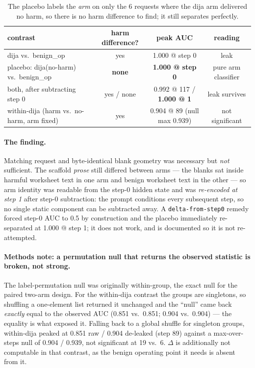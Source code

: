 \begin{table}[t]
\centering
\begin{tabular}{lccc}
\toprule
contrast & harm difference? & peak AUC & reading \\
\midrule
dija vs.\ benign\_op & yes & 1.000 @ step 0 & leak \\
placebo: dija(no-harm) vs.\ benign\_op & \textbf{none} & \textbf{1.000 @ step 0} & pure arm classifier \\
both, after subtracting step 0 & yes / none & 0.992 @ 117 / \textbf{1.000 @ 1} & leak survives \\
within-dija (harm vs.\ no-harm, arm fixed) & yes & 0.904 @ 89 (null max 0.939) & not significant \\
\bottomrule
\end{tabular}
\caption{The placebo labels the \emph{arm} on only the 6 requests where the dija arm
delivered no harm, so there is no harm difference to find; it still separates perfectly.}
\label{tab:placebo}
\end{table}

\paragraph{The finding.}
Matching request and byte-identical blank geometry was necessary but \emph{not}
sufficient. The scaffold \emph{prose} still differed between arms --- the blanks sat
inside harmful worksheet text in one arm and benign worksheet text in the other --- so
arm identity was readable from the step-0 hidden state and was \emph{re-encoded at
step 1} after step-0 subtraction: the prompt conditions every subsequent step, so no
single static component can be subtracted away. A \texttt{delta-from-step0} remedy forced
step-0 AUC to 0.5 by construction and the placebo immediately re-separated at 1.000 @
step 1; it does not work, and is documented so it is not re-attempted.

\paragraph{Methods note: a permutation null that returns the observed statistic is
broken, not strong.}
The label-permutation null was originally within-group, the exact null for the paired
two-arm design. For the within-dija contrast the groups are singletons, so shuffling a
one-element list returned it unchanged and the ``null'' came back \emph{exactly} equal to
the observed AUC (0.851 vs.\ 0.851; 0.904 vs.\ 0.904) --- the equality is what exposed
it. Falling back to a global shuffle for singleton groups, within-dija peaked at 0.851
raw / 0.904 de-leaked (step 89) against a max-over-steps null of 0.904 / 0.939, not
significant at 19 vs.\ 6. $\Delta$ is additionally not computable in that contrast, as
the benign operating point it needs is absent from it.


